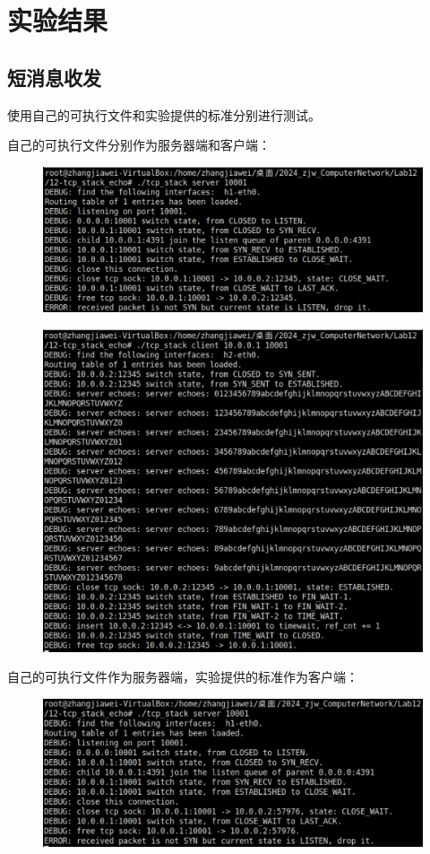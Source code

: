\documentclass[UTF8]{report}
\begin{document}
\section{实验结果}

\subsection{短消息收发}

使用自己的可执行文件和实验提供的标准分别进行测试。

自己的可执行文件分别作为服务器端和客户端：

\begin{figure}[H]
    \centering
    \includegraphics[width=.75\textwidth]{my_server_my_client_echo_h1.png}
\end{figure}

\begin{figure}[H]
    \centering
    \includegraphics[width=.75\textwidth]{my_server_my_client_echo_h2.png}
\end{figure}

自己的可执行文件作为服务器端，实验提供的标准作为客户端：

\begin{figure}[H]
    \centering
    \includegraphics[width=.75\textwidth]{my_server_std_client_echo_h1.png}
\end{figure}
\end{document}
